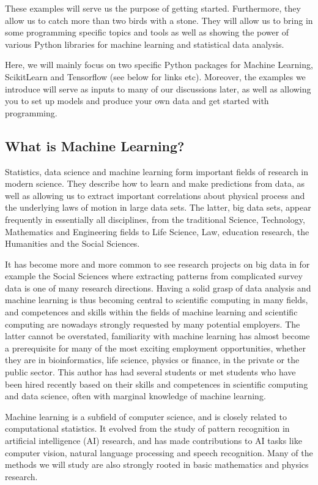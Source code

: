\documentclass[letterpaper,10pt,english]{sphinxmanual}
\begin{document}
These examples will serve us the purpose of getting
started. Furthermore, they allow us to catch more than two birds with
a stone. They will allow us to bring in some programming specific
topics and tools as well as showing the power of various Python
libraries for machine learning and statistical data analysis.

Here, we will mainly focus on two
specific Python packages for Machine Learning, Scikit\sphinxhyphen{}Learn and
Tensorflow (see below for links etc).  Moreover, the examples we
introduce will serve as inputs to many of our discussions later, as
well as allowing you to set up models and produce your own data and
get started with programming.


\subsection{What is Machine Learning?}
\label{\detokenize{chapter2:what-is-machine-learning}}
Statistics, data science and machine learning form important fields of
research in modern science.  They describe how to learn and make
predictions from data, as well as allowing us to extract important
correlations about physical process and the underlying laws of motion
in large data sets. The latter, big data sets, appear frequently in
essentially all disciplines, from the traditional Science, Technology,
Mathematics and Engineering fields to Life Science, Law, education
research, the Humanities and the Social Sciences.

It has become more
and more common to see research projects on big data in for example
the Social Sciences where extracting patterns from complicated survey
data is one of many research directions.  Having a solid grasp of data
analysis and machine learning is thus becoming central to scientific
computing in many fields, and competences and skills within the fields
of machine learning and scientific computing are nowadays strongly
requested by many potential employers. The latter cannot be
overstated, familiarity with machine learning has almost become a
prerequisite for many of the most exciting employment opportunities,
whether they are in bioinformatics, life science, physics or finance,
in the private or the public sector. This author has had several
students or met students who have been hired recently based on their
skills and competences in scientific computing and data science, often
with marginal knowledge of machine learning.

Machine learning is a subfield of computer science, and is closely
related to computational statistics.  It evolved from the study of
pattern recognition in artificial intelligence (AI) research, and has
made contributions to AI tasks like computer vision, natural language
processing and speech recognition. Many of the methods we will study are also
strongly rooted in basic mathematics and physics research.
\end{document}
